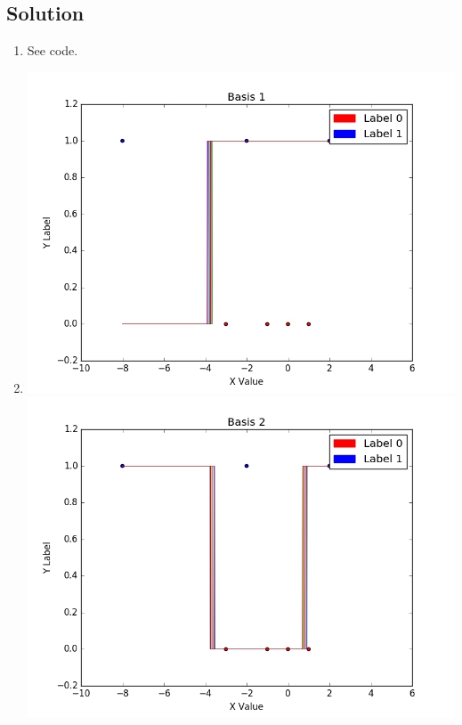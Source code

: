 \documentclass[submit]{harvardml}
\begin{document}
\subsection*{Solution}
\begin{enumerate}
    \item See code.
    \item \hspace{2cm} \newline
    \includegraphics[scale=.40]{hw2/P1_Pics/figure_1.png}
    \includegraphics[scale=.40]{hw2/P1_Pics/figure_1-1.png}

\end{enumerate}
\end{document}
